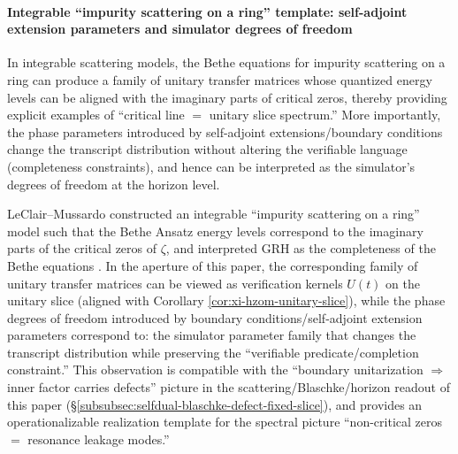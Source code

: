 \paragraph{Integrable ``impurity scattering on a ring'' template: self-adjoint extension parameters and simulator degrees of freedom}
In integrable scattering models, the Bethe equations for impurity scattering on a ring can produce a family of unitary transfer matrices whose quantized energy levels can be aligned with the imaginary parts of critical zeros, thereby providing explicit examples of ``critical line \(=\) unitary slice spectrum.''
More importantly, the phase parameters introduced by self-adjoint extensions/boundary conditions change the transcript distribution without altering the verifiable language (completeness constraints), and hence can be interpreted as the simulator's degrees of freedom at the horizon level.

\begin{remark}\label{rem:xi-hzom-impurity-scattering-simulator-freedom}
LeClair--Mussardo constructed an integrable ``impurity scattering on a ring'' model such that the Bethe Ansatz energy levels correspond to the imaginary parts of the critical zeros of \(\zeta\), and interpreted GRH as the completeness of the Bethe equations \cite{LeClairMussardo2024RiemannZerosImpurities}.
In the aperture of this paper, the corresponding family of unitary transfer matrices can be viewed as verification kernels \(U(t)\) on the unitary slice (aligned with Corollary \ref{cor:xi-hzom-unitary-slice}), while the phase degrees of freedom introduced by boundary conditions/self-adjoint extension parameters correspond to: the simulator parameter family that changes the transcript distribution while preserving the ``verifiable predicate/completion constraint.''
This observation is compatible with the ``boundary unitarization \(\Rightarrow\) inner factor carries defects'' picture in the scattering/Blaschke/horizon readout of this paper (\S\ref{subsubsec:selfdual-blaschke-defect-fixed-slice}), and provides an operationalizable realization template for the spectral picture ``non-critical zeros \(=\) resonance leakage modes.''
\end{remark}

